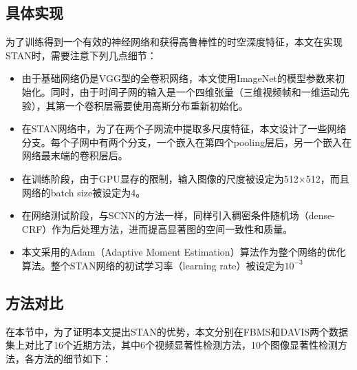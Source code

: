 \subsection{具体实现}
为了训练得到一个有效的神经网络和获得高鲁棒性的时空深度特征，本文在实现STAN时，需要注意下列几点细节：
\begin{itemize}
  \item 由于基础网络仍是VGG型的全卷积网络，本文使用ImageNet的模型参数来初始化。同时，由于时间子网的输入是一个四维张量（三维视频帧和一维运动先验），其第一个卷积层需要使用高斯分布重新初始化。
  \item 在STAN网络中，为了在两个子网流中提取多尺度特征，本文设计了一些网络分支。每个子网中有两个分支，一个嵌入在第四个pooling层后，另一个嵌入在网络最末端的卷积层后。
  \item 在训练阶段，由于GPU显存的限制，输入图像的尺度被设定为512$\times$512，而且网络的batch size被设定为4。
  \item 在网络测试阶段，与SCNN的方法一样，同样引入稠密条件随机场（dense-CRF）\cite{chen2014semantic}作为后处理方法，进而提高显著图的空间一致性和质量。
  \item 本文采用的Adam（Adaptive Moment Estimation）算法作为整个网络的优化算法。整个STAN网络的初试学习率（learning rate）被设定为$10^{-3}$
\end{itemize}

\subsection{方法对比}
在本节中，为了证明本文提出STAN的优势，本文分别在FBMS和DAVIS两个数据集上对比了16个近期方法，其中6个视频显著性检测方法，10个图像显著性检测方法，各方法的细节如下：

